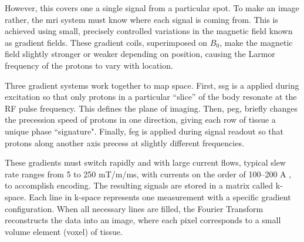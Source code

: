 
However, this covers one a single signal from a particular spot. To make an image rather, the \gls{mri} system must know where each signal is coming from. This is achieved using small, precisely controlled variations in the magnetic field known as gradient fields. These gradient coils, superimposed on $B_0$, make the magnetic field slightly stronger or weaker depending on position, causing the Larmor frequency of the protons to vary with location.

Three gradient systems work together to map space. First, \gls{ssg} is a applied during excitation so that only protons in a particular “slice” of the body resonate at the RF pulse frequency. This defines the plane of imaging. Then, \gls{peg}, briefly changes the precession speed of protons in one direction, giving each row of tissue a unique phase ``signature". Finally, \gls{feg} is applied during signal readout so that protons along another axis precess at slightly different frequencies.



These gradients must switch rapidly and with large current flows, typical slew rate ranges from 5 to 250 mT/m/ms, with currents on the order of 100–200 A \cite{bushberg2011,Prince_MedicalImaging_2015}, to accomplish encoding. The resulting signals are stored in a matrix called k-space. Each line in k-space represents one measurement with a specific gradient configuration. When all necessary lines are filled, the Fourier Transform reconstructs the data into an image, where each pixel corresponds to a small volume element (voxel) of tissue.

